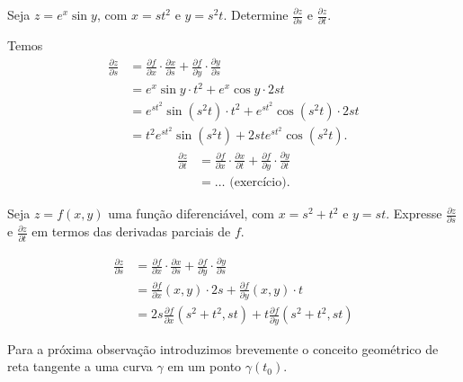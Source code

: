 \begin{example}
    Seja \(z = e^x\sin y\), com \(x = st^2\) e \(y = s^2t\). Determine \(\frac{\partial z}{\partial s}\) e \(\frac{\partial z}{\partial t}\).

    Temos
        \begin{align*}
            \frac{\partial z}{\partial s} 
                & = \frac{\partial f}{\partial x}\cdot\frac{\partial x}{\partial s} + \frac{\partial f}{\partial y}\cdot\frac{\partial y}{\partial s} \\
                & = e^x \sin y \cdot t^2 + e^x\cos y\cdot 2s t\\
                & = e^{st^2}\sin(s^2 t)\cdot t^2 + e^{st^2}\cos(s^2 t)\cdot 2st \\
                & = t^2 e^{st^2}\sin(s^2 t) + 2ste^{st^2}\cos(s^2t).
        \end{align*}
        \begin{align*}
            \frac{\partial z}{\partial t} 
                & = \frac{\partial f}{\partial x}\cdot\frac{\partial x}{\partial t} + \frac{\partial f}{\partial y}\cdot\frac{\partial y}{\partial t} \\
                & = \dots \text{ (exercício)}.
        \end{align*}
\end{example}

\begin{example}
    Seja \(z = f(x,y)\) uma função diferenciável, com \(x = s^2 + t^2\) e \(y = st\). Expresse \(\frac{\partial z}{\partial s}\) e \(\frac{\partial z}{\partial t}\) em termos das derivadas parciais de \(f\).

        \begin{align*}
            \frac{\partial z}{\partial s} 
                & = \frac{\partial f}{\partial x}\cdot\frac{\partial x}{\partial s} + \frac{\partial f}{\partial y}\cdot\frac{\partial y}{\partial s} \\
                & = \frac{\partial f}{\partial x}(x,y)\cdot 2s + \frac{\partial f}{\partial y}(x,y)\cdot t \\
                & = 2s\frac{\partial f}{\partial x}(s^2 + t^2, st) + t\frac{\partial f}{\partial y}(s^2+t^2,st)
        \end{align*}
\end{example}

Para a próxima observação introduzimos brevemente o conceito geométrico de reta tangente a uma curva \(\gamma\) em um ponto \(\gamma(t_0)\).

